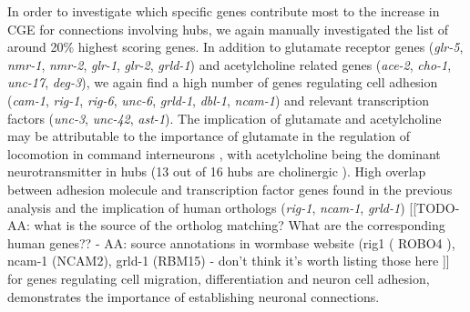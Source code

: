 \documentclass[10pt,letterpaper]{article}
\begin{document}
{%
In order to investigate which specific genes contribute most to the increase in CGE for connections involving hubs, we again manually investigated the list of around 20\% highest scoring genes.
In addition to glutamate receptor genes (\emph{glr-5}, \emph{nmr-1}, \emph{nmr-2}, \emph{glr-1}, \emph{glr-2}, \emph{grld-1})
and acetylcholine related genes (\emph{ace-2}, \emph{cho-1}, \emph{unc-17}, \emph{deg-3}),
we again find a high number of genes regulating cell adhesion (\emph{cam-1}, \emph{rig-1}, \emph{rig-6}, \emph{unc-6}, \emph{grld-1}, \emph{dbl-1}, \emph{ncam-1})
and relevant transcription factors (\emph{unc-3}, \emph{unc-42}, \emph{ast-1}).
The implication of glutamate and acetylcholine may be attributable to the importance of glutamate in the regulation of locomotion in command interneurons \cite{Choi2015, Zheng1999}, with acetylcholine being the dominant neurotransmitter in hubs (13 out of 16 hubs are cholinergic \cite{Pereira:2015er}).
High overlap between adhesion molecule and transcription factor genes found in the previous analysis and the implication of human orthologs (\emph{rig-1}, \emph{ncam-1}, \emph{grld-1}) [[TODO-AA: what is the source of the ortholog matching? What are the corresponding human genes?? - AA: source annotations in wormbase website (rig1 ( ROBO4 ), ncam-1 (NCAM2), grld-1 (RBM15) - don't think it's worth listing those here ]] \cite{Harris:2009kd} for genes regulating cell migration, differentiation and neuron cell adhesion, demonstrates the importance of establishing neuronal connections.

}
\end{document}
